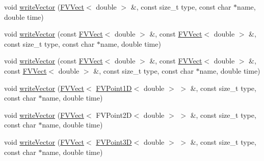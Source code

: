 \begin{DoxyCompactItemize}
\item 
void \hyperlink{classGmsh_a08dad2ee34abbc61f49d177b127dd66c}{writeVector} (\hyperlink{classFVVect}{FVVect}$<$ double $>$ \&, const size\_\-t type, const char $\ast$name, double time)
\item 
void \hyperlink{classGmsh_ab5a9ab67d5c0defc304b912832916f98}{writeVector} (const \hyperlink{classFVVect}{FVVect}$<$ double $>$ \&, const \hyperlink{classFVVect}{FVVect}$<$ double $>$ \&, const size\_\-t type, const char $\ast$name, double time)
\item 
void \hyperlink{classGmsh_a70c1eb0ea4541a96417c7be9ef1326a2}{writeVector} (const \hyperlink{classFVVect}{FVVect}$<$ double $>$ \&, const \hyperlink{classFVVect}{FVVect}$<$ double $>$ \&, const \hyperlink{classFVVect}{FVVect}$<$ double $>$ \&, const size\_\-t type, const char $\ast$name, double time)
\item 
void \hyperlink{classGmsh_a1e980b0bcfcdf66da0dd091765102477}{writeVector} (\hyperlink{classFVVect}{FVVect}$<$ \hyperlink{classFVPoint1D}{FVPoint1D}$<$ double $>$ $>$ \&, const size\_\-t type, const char $\ast$name, double time)
\item 
void \hyperlink{classGmsh_a14e065398cfc6b8225c5aff82678b542}{writeVector} (\hyperlink{classFVVect}{FVVect}$<$ FVPoint2D$<$ double $>$ $>$ \&, const size\_\-t type, const char $\ast$name, double time)
\item 
void \hyperlink{classGmsh_acd9861f26525833b58ea5ac69001516e}{writeVector} (\hyperlink{classFVVect}{FVVect}$<$ \hyperlink{classFVPoint3D}{FVPoint3D}$<$ double $>$ $>$ \&, const size\_\-t type, const char $\ast$name, double time)
\end{DoxyCompactItemize}


